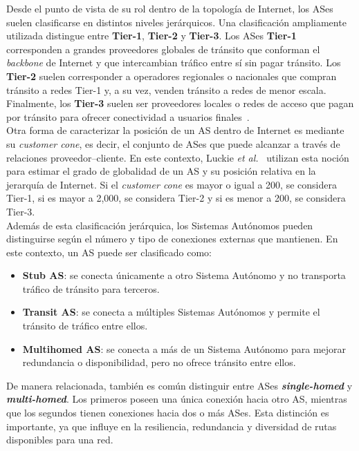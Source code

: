 Desde el punto de vista de su rol dentro de la topología de Internet, los ASes suelen clasificarse en distintos niveles jerárquicos. 
Una clasificación ampliamente utilizada distingue entre \textbf{Tier-1}, \textbf{Tier-2} y \textbf{Tier-3}. 
Los ASes \textbf{Tier-1} corresponden a grandes proveedores globales de tránsito que conforman el \textit{backbone} de Internet y que intercambian tráfico entre sí sin pagar tránsito. 
Los \textbf{Tier-2} suelen corresponder a operadores regionales o nacionales que compran tránsito a redes Tier-1 y, a su vez, venden tránsito a redes de menor escala. 
Finalmente, los \textbf{Tier-3} suelen ser proveedores locales o redes de acceso que pagan por tránsito para ofrecer conectividad a usuarios finales~\cite{InterconnectionPeeringSettlements}.\\

Otra forma de caracterizar la posición de un AS dentro de Internet es mediante su \textit{customer cone}, es decir, el conjunto de ASes que puede alcanzar a través de relaciones proveedor--cliente. 
En este contexto, Luckie \textit{et al.}~\cite{ASRank} utilizan esta noción para estimar el grado de globalidad de un AS y su posición relativa en la jerarquía de Internet.
Si el \textit{customer cone} es mayor o igual a 200, se considera Tier-1, si es mayor a 2,000, se considera Tier-2 y si es menor a 200, se considera Tier-3.\\


Además de esta clasificación jerárquica, los Sistemas Autónomos pueden distinguirse según el número y tipo de conexiones externas que mantienen. 
En este contexto, un AS puede ser clasificado como:

\begin{itemize}
    \item \textbf{Stub AS}: se conecta únicamente a otro Sistema Autónomo y no transporta tráfico de tránsito para terceros.
    \item \textbf{Transit AS}: se conecta a múltiples Sistemas Autónomos y permite el tránsito de tráfico entre ellos.
    \item \textbf{Multihomed AS}: se conecta a más de un Sistema Autónomo para mejorar redundancia o disponibilidad, pero no ofrece tránsito entre ellos.
\end{itemize}

De manera relacionada, también es común distinguir entre ASes \textbf{\textit{single-homed}} y \textbf{\textit{multi-homed}}. 
Los primeros poseen una única conexión hacia otro AS, mientras que los segundos tienen conexiones hacia dos o más ASes. 
Esta distinción es importante, ya que influye en la resiliencia, redundancia y diversidad de rutas disponibles para una red.\\




